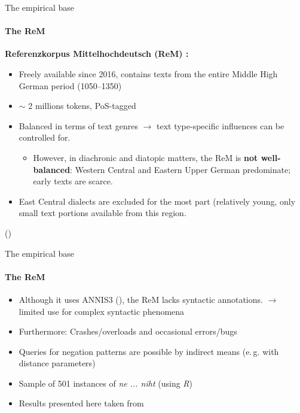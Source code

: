 \documentclass[xcolor=table, compress, %
handout
]{beamer}
\begin{document}
\begin{frame}{The empirical base}
\framesubtitle{The ReM}

\textbf{Referenzkorpus Mittelhochdeutsch (ReM) :}
    \begin{itemize}
        \item Freely available since 2016, contains texts from the entire Middle High German period (1050–1350) 
        \item $\sim$ 2 millions tokens, PoS-tagged
        \item \alert{Balanced} in terms of text genres $\rightarrow$ text type-specific influences can be controlled for.
 \begin{itemize}       
         \item However, in \alert{diachronic and diatopic matters}, the ReM is \textbf{not well-balanced}: Western Central and Eastern Upper German predominate; early texts are scarce.
\end{itemize}
\end{itemize}

{\small
\begin{itemize}
\item[\Pointinghand] East Central dialects are excluded for the most part (relatively young, only small text portions available from this region.
\end{itemize}
}

{\tiny (\citealt{kleinetal16})}

\end{frame}

\begin{frame}{The empirical base}
\framesubtitle{The ReM}

    \begin{itemize}
        \item Although it uses ANNIS3 (\citealt{Krause2016}), the ReM  \alert{lacks syntactic annotations}. $\rightarrow$ limited use for complex syntactic phenomena
        \item Furthermore: Crashes/overloads and occasional errors/bugs 
        \item Queries for negation patterns are possible by indirect means (e.\,g. with distance parameters)
        \item Sample of 501 instances of \textit{ne ... niht} (using \textit{R})
        \item Results presented here taken from \citet{hrbek21}
    \end{itemize}

\end{frame}
\end{document}
